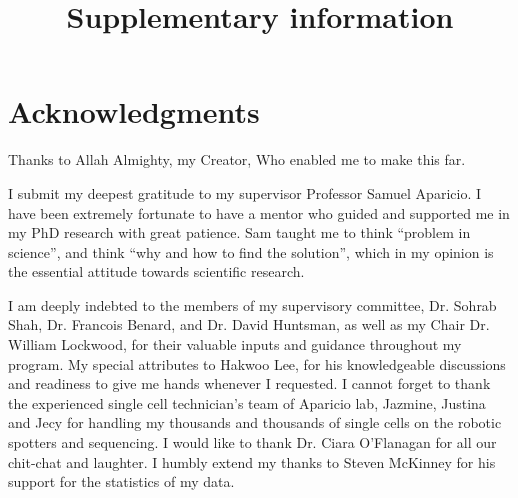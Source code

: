 

\makeatletter
\newcommand{\putFigLargCap}[5]
{
\begin{center}
\texttt{[image: \#1]}   
\bigskip
\setbox0\vbox{
\let\caption@rule\relax
\captionof{figure}[#5]{\textbf{#5} #3 \label{#4}}
\global\skip1\lastskip\unskip
\global\setbox1\lastbox

}
\unvbox0
\setbox0\hbox{\unhbox1\unskip\unskip\unpenalty
\global\setbox1\lastbox}
\unvbox1
\vskip\skip1
\end{center}
}
\makeatother





\title{Supplementary information}















\chapter{Acknowledgments}

Thanks to Allah Almighty, my Creator, Who enabled me to make this far.

I submit my deepest gratitude to my supervisor Professor Samuel Aparicio. I have been extremely fortunate to have a mentor who guided and supported me in my PhD research with great patience. Sam taught me to think “problem in science”, and think “why and how to find the solution”, which in my opinion is the essential attitude towards scientific research. 

I am deeply indebted to the members of my supervisory committee, Dr. Sohrab Shah, Dr. Francois Benard, and Dr. David Huntsman, as well as my Chair Dr. William Lockwood, for their valuable inputs and guidance throughout my program. My special attributes to Hakwoo Lee, for his knowledgeable discussions and  readiness to give me hands whenever I requested. I cannot forget to thank the experienced single cell technician's team of Aparicio lab, Jazmine, Justina and Jecy for handling my thousands and thousands of single cells on the robotic spotters and sequencing. I would like to thank Dr. Ciara O'Flanagan for all our chit-chat and laughter. I humbly extend my thanks to Steven McKinney for his support for the statistics of my data.

